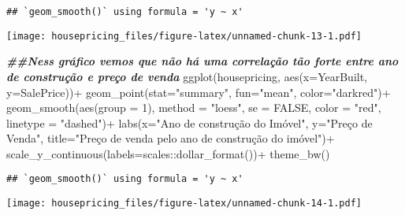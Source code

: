 \documentclass[
]{article}
\newenvironment{Shaded}{\begin{snugshade}}{\end{snugshade}}
\newcommand{\AttributeTok}[1]{\textcolor[rgb]{0.77,0.63,0.00}{#1}}
\newcommand{\ConstantTok}[1]{\textcolor[rgb]{0.00,0.00,0.00}{#1}}
\newcommand{\DecValTok}[1]{\textcolor[rgb]{0.00,0.00,0.81}{#1}}
\newcommand{\DocumentationTok}[1]{\textcolor[rgb]{0.56,0.35,0.01}{\textbf{\textit{#1}}}}
\newcommand{\FunctionTok}[1]{\textcolor[rgb]{0.00,0.00,0.00}{#1}}
\newcommand{\NormalTok}[1]{#1}
\newcommand{\SpecialCharTok}[1]{\textcolor[rgb]{0.00,0.00,0.00}{#1}}
\newcommand{\StringTok}[1]{\textcolor[rgb]{0.31,0.60,0.02}{#1}}
\begin{document}
\begin{verbatim}
## `geom_smooth()` using formula = 'y ~ x'
\end{verbatim}

\texttt{[image: housepricing\_files/figure-latex/unnamed-chunk-13-1.pdf]}

\begin{Shaded}
\begin{Highlighting}[]
\DocumentationTok{\#\#Ness gráfico vemos que não há uma correlação tão forte entre ano de construção e preço de venda}
\FunctionTok{ggplot}\NormalTok{(housepricing, }\FunctionTok{aes}\NormalTok{(}\AttributeTok{x=}\NormalTok{YearBuilt, }\AttributeTok{y=}\NormalTok{SalePrice))}\SpecialCharTok{+}
  \FunctionTok{geom\_point}\NormalTok{(}\AttributeTok{stat=}\StringTok{"summary"}\NormalTok{, }\AttributeTok{fun=}\StringTok{"mean"}\NormalTok{, }\AttributeTok{color=}\StringTok{"darkred"}\NormalTok{)}\SpecialCharTok{+}
  \FunctionTok{geom\_smooth}\NormalTok{(}\FunctionTok{aes}\NormalTok{(}\AttributeTok{group =} \DecValTok{1}\NormalTok{), }\AttributeTok{method =} \StringTok{"loess"}\NormalTok{, }\AttributeTok{se =} \ConstantTok{FALSE}\NormalTok{, }\AttributeTok{color =} \StringTok{"red"}\NormalTok{, }\AttributeTok{linetype =} \StringTok{"dashed"}\NormalTok{)}\SpecialCharTok{+}
  \FunctionTok{labs}\NormalTok{(}\AttributeTok{x=}\StringTok{"Ano de construção do Imóvel"}\NormalTok{, }\AttributeTok{y=}\StringTok{"Preço de Venda"}\NormalTok{, }\AttributeTok{title=}\StringTok{"Preço de venda pelo ano de construção do imóvel"}\NormalTok{)}\SpecialCharTok{+}
  \FunctionTok{scale\_y\_continuous}\NormalTok{(}\AttributeTok{labels=}\NormalTok{scales}\SpecialCharTok{::}\FunctionTok{dollar\_format}\NormalTok{())}\SpecialCharTok{+}
  \FunctionTok{theme\_bw}\NormalTok{()}
\end{Highlighting}
\end{Shaded}

\begin{verbatim}
## `geom_smooth()` using formula = 'y ~ x'
\end{verbatim}

\texttt{[image: housepricing\_files/figure-latex/unnamed-chunk-14-1.pdf]}
\end{document}
